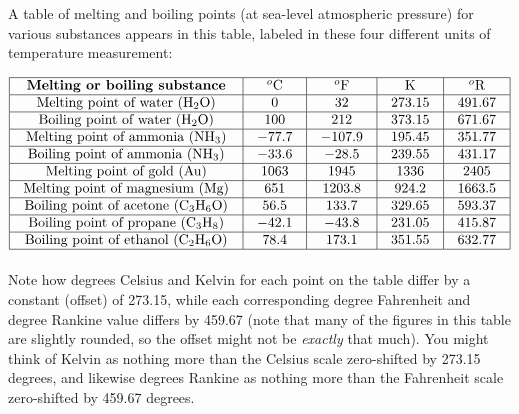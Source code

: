\filbreak

A table of melting and boiling points (at sea-level atmospheric pressure) for various substances appears in this table, labeled in these four different units of temperature measurement:


$$\vbox{\offinterlineskip
\halign{\strut
\vrule \quad\hfil # \ \hfil & 
\vrule \quad\hfil # \ \hfil & 
\vrule \quad\hfil # \ \hfil & 
\vrule \quad\hfil # \ \hfil & 
\vrule \quad\hfil # \ \hfil \vrule \cr
\noalign{\hrule}
%
\textbf{Melting or boiling substance} & $^{o}$C & $^{o}$F & K & $^{o}$R \cr
%
\noalign{\hrule}
%
Melting point of water (H$_{2}$O) & 0 & 32 & 273.15 & 491.67 \cr
%
\noalign{\hrule}
%
Boiling point of water (H$_{2}$O) & 100 & 212 & 373.15 & 671.67 \cr
%
\noalign{\hrule}
%
Melting point of ammonia (NH$_{3}$) & $-77.7$ & $-107.9$ & 195.45 & 351.77 \cr
%
\noalign{\hrule}
%
Boiling point of ammonia (NH$_{3}$) & $-33.6$ & $-28.5$ & 239.55 & 431.17 \cr
%
\noalign{\hrule}
%
Melting point of gold (Au) & 1063 & 1945 & 1336 & 2405 \cr
%
\noalign{\hrule}
%
Melting point of magnesium (Mg) & 651 & 1203.8 & 924.2 & 1663.5 \cr
%
\noalign{\hrule}
%
Boiling point of acetone (C$_{3}$H$_{6}$O) & 56.5 & 133.7 & 329.65 & 593.37 \cr
%
\noalign{\hrule}
%
Boiling point of propane (C$_{3}$H$_{8}$) & $-42.1$ & $-43.8$ & 231.05 & 415.87 \cr
%
\noalign{\hrule}
%
Boiling point of ethanol (C$_{2}$H$_{6}$O) & 78.4 & 173.1 & 351.55 & 632.77 \cr
%
\noalign{\hrule}
} %
}$$ %

Note how degrees Celsius and Kelvin for each point on the table differ by a constant (offset) of 273.15, while each corresponding degree Fahrenheit and degree Rankine value differs by 459.67 (note that many of the figures in this table are slightly rounded, so the offset might not be \textit{exactly} that much).  You might think of Kelvin as nothing more than the Celsius scale zero-shifted by 273.15 degrees, and likewise degrees Rankine as nothing more than the Fahrenheit scale zero-shifted by 459.67 degrees.

